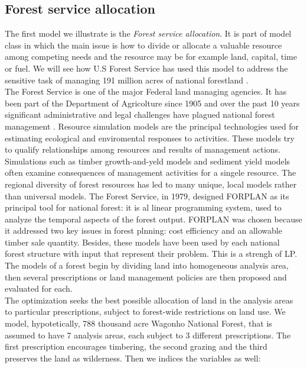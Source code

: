\documentclass[a4paper,10 pt,titlepage,twoside]{book}
\theoremstyle{plain}
\theoremstyle{definition}
\theoremstyle{remark}
\begin{document}
\subsection*{Forest service allocation} 
The first model we illustrate is the \textit{Forest service allocation}. It is part of model class in which the main issue is how to divide or allocate a valuable resource among competing needs and the resource may be for example land, capital, time or fuel. We will see how U.S Forest Service has used this model to address the sensitive task of managing 191 million acres of national forestland \cite{(Natural)}.\\
The Forest Service is one of the major Federal land managing agencies. It has been part of the Department of Agricolture since 1905 and over the past 10 years significant administrative and legal challenges have plagued national forest management \cite{ForSer}. Resource simulation models are the principal technologies used for estimating ecological and enviromental responses to activities. These models try to qualify relationships among resources and results of management actions. Simulations such as timber growth-and-yeld models and sediment yield models often examine consequences of management activities for a singele resource. The regional diversity of forest resources has led to many unique, local models rather than universal models. The Forest Service, in 1979, designed FORPLAN as its principal tool for national forest: it is al linear programming system, used to analyze the temporal aspects of the forest output. FORPLAN was chosen because it addressed two key issues in forest plnning: cost efficiency and an allowable timber sale quantity. Besides, these models have been used by each national forest structure with input that represent their problem. This is a strengh of LP. \\
The models of a forest begin  by dividing land into homogeneous analysis area, then several prescriptions or land management policies are then proposed and evaluated for each. \\The optimization seeks the best possible allocation of land in the analysis areas to particular prescriptions, subject to forest-wide restrictions on land use.
We model, hypotetically, 788 thousand acre Wagonho National Forest, that is assumed to have 7 analysis areas, each subject to 3 different prescriptions. The first prescription encourages timbering, the second grazing and the third preserves the land as wilderness. Then we indices the variables as well:
\end{document}
